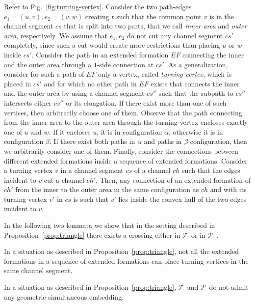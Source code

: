 \documentclass[a4paper,10pt]{llncs}
\newcounter{prop}
\newcommand{\T}{\mbox{$\mathcal T$ }}
\renewcommand{\P}{\mbox{$\mathcal P$ }}
\begin{document}
Refer to Fig.~\ref{fig:turning-vertex}. Consider the two path-edges $e_1=(u,v),e_2=(v,w)$ creating $t$ such that the common point $v$ is in the channel segment $cs$ that is split into two parts, that we call {\it inner area} and {\it outer area}, respectively. We assume that $e_1,e_2$ do not cut any channel segment $cs'$ completely, since such a cut would create more restrictions than placing $u$ or $w$ inside $cs'$. Consider the path in an extended formation $EF$ connecting the inner and the outer area through a $1$-side connection at $cs'$. As a generalization, consider for such a path of $EF$ only a vertex, called \emph{turning vertex}, which is placed in $cs'$ and for which no other path in $EF$ exists that connects the inner and the outer area by using a channel segment $cs''$ such that the subpath to $cs''$ intersects either $cs''$ or its elongation. If there exist more than one of such vertices, then arbitrarily choose one of them. Observe that the path connecting from the inner area to the outer area through the turning vertex encloses exactly one of $u$ and $w$. If it encloses $u$, it is in configuration $\alpha$, otherwise it is in configuration $\beta$. If there exist both paths in $\alpha$ and paths in $\beta$ configuration, then we arbitrarily consider one of them. Finally, consider the connections between different extended formations inside a sequence of extended formations. Consider a turning vertex $v$ in a channel segment $cs$ of a channel $ch$ such that the edges incident to $v$ cut a channel $ch'$. Then, any connection of an extended formation of $ch'$ from the inner to the outer area in the same configuration as $ch$ and with its turning vertex $v'$ in $cs$ is such that $v'$ lies inside the convex hull of the two edges incident to $v$.

In the following two lemmata we show that in the setting described in Proposition~\ref{prop:triangle} there exists a crossing either in \T or in \P.

\begin{lemma}
\label{lem:one_channel_segment}
In a situation as described in Proposition~\ref{prop:triangle}, not all the extended formations in a sequence of extended formations can place turning vertices in the same channel segment.
\end{lemma}

\begin{lemma}\label{lem:prop3-nodrawing}
In a situation as described in Proposition~\ref{prop:triangle}, \T and \P do not admit any geometric simultaneous embedding.
\end{lemma}
\end{document}
